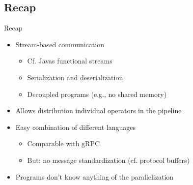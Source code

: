 \subsection{Recap} %
\begin{frame}{Recap}
   \begin{itemize}[<+(1)->]
      \itemsep12pt
      \item Stream-based communication \begin{itemize}
         \item Cf. Javas functional streams
         \item Serialization and deserialization %
         \item Decoupled programs (e.g., no shared memory)
      \end{itemize}
      \item Allows distribution individual operators in the pipeline
      \item Easy combination of different languages \begin{itemize}
         \item Comparable with gRPC
         \item But: no message standardization (cf. protocol buffers)
      \end{itemize}
      \item Programs don't know anything of the parallelization
   \end{itemize}
\end{frame}
\SidebarReset

